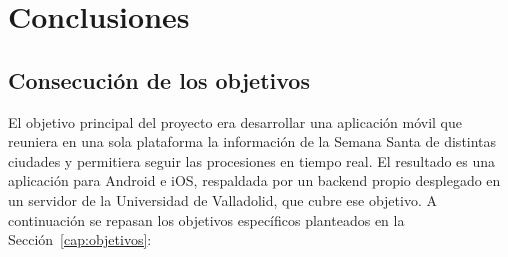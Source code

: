 \chapter{Conclusiones}\label{cap:conclusiones}

\section{Consecución de los objetivos}\label{sec:consecucionObjetivos}

El objetivo principal del proyecto era desarrollar una aplicación móvil que reuniera en una sola plataforma la información de la Semana Santa de distintas ciudades y permitiera seguir las procesiones en tiempo real. El resultado es una aplicación para Android e iOS, respaldada por un backend propio desplegado en un servidor de la Universidad de Valladolid, que cubre ese objetivo. A continuación se repasan los objetivos específicos planteados en la Sección~\ref{cap:objetivos}:

